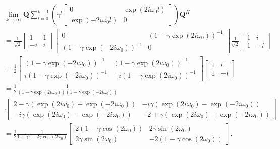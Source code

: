 \documentclass[11pt,a4paper,twoside]{report}
\newcommand{\mat}[1]{\mathbf{#1}}
\begin{document}
\begin{align}
	\label{eq: second term}
	&\underset{k \rightarrow \infty}{\lim} \mat{Q}\sum_{l=0}^{k-1}\left(\gamma^{l}
		\begin{bmatrix}
			0 & \exp{(2i\omega_0l)} \\
			\exp{(-2i\omega_0l)} & 0
		\end{bmatrix}
		\right)\mat{Q}^H
	\\
	\nonumber
	&= \frac{1}{\sqrt{2}}
		\begin{bmatrix}
			1 & 1\\
			-i & i
		\end{bmatrix}
		\begin{bmatrix}
			0 & \left(1-\gamma \exp{\left(2i\omega_0\right)}\right)^{-1} \\
			\left(1-\gamma \exp{\left(-2i\omega_0\right)}\right)^{-1} & 0
		\end{bmatrix}
		\frac{1}{\sqrt{2}}
		\begin{bmatrix}
			1 & i \\
			1 & -i
		\end{bmatrix}
	\\
	\nonumber
	&= \frac{1}{2}
		\begin{bmatrix}
			\left(1-\gamma \exp{\left(-2i\omega_0\right)}\right)^{-1} & \left(1-\gamma \exp{\left(2i\omega_0\right)}\right)^{-1} \\
			i\left(1-\gamma \exp{\left(-2i\omega_0\right)}\right)^{-1} & -i\left(1-\gamma \exp{\left(2i\omega_0\right)}\right)^{-1}
		\end{bmatrix}
		\begin{bmatrix}
			1 & i \\
			1 & -i
		\end{bmatrix}
	\\
	\nonumber
	&= \frac{1}{2} \frac{1}{\left( 1-\gamma\exp(2i\omega_0) \right)  \left( 1-\gamma\exp(-2i\omega_0) \right)}\\
	\nonumber
	& \cdot
		\begin{bmatrix}
			2 - \gamma \left( \exp(2i\omega_0) + \exp(-2i\omega_0) \right) & -i \gamma \left( \exp(2i\omega_0) - \exp(-2i\omega_0) \right) \\
			 -i \gamma \left( \exp(2i\omega_0) - \exp(-2i\omega_0) \right) & -2 + \gamma \left( \exp(2i\omega_0) + \exp(-2i\omega_0) \right)
		\end{bmatrix}
	\\
	&= \frac{1}{2} \frac{1}{1+\gamma^2 - 2 \gamma \cos\left( 2\omega_0 \right)}
		\begin{bmatrix}
			2\left(1 - \gamma \cos\left( 2\omega_0 \right)\right) & 2 \gamma \sin\left( 2 \omega_0 \right) \\
			 2 \gamma \sin\left( 2 \omega_0 \right) &- 2\left(1 - \gamma \cos\left( 2\omega_0 \right)\right)
		\end{bmatrix} .
\end{align}
\end{document}
